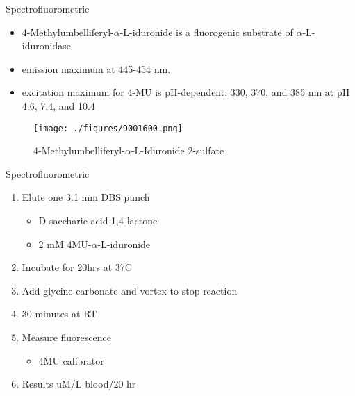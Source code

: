 \documentclass[presentation, smaller]{beamer}
\begin{document}
\begin{frame}[label={sec:orgheadline10}]{Spectrofluorometric}
\begin{itemize}
\item 4-Methylumbelliferyl-\(\alpha\)-L-iduronide is a fluorogenic substrate of \(\alpha\)-L-iduronidase
\item emission maximum at 445-454 nm.
\item excitation maximum for 4-MU is pH-dependent: 330, 370, and 385 nm at pH 4.6, 7.4, and 10.4
\end{itemize}

\begin{figure}[htb]
\centering
\texttt{[image: ./figures/9001600.png]}
\caption[4MUI]{\label{fig:4mui}
4-Methylumbelliferyl-\(\alpha\)-L-Iduronide 2-sulfate}
\end{figure}
\end{frame}


\begin{frame}[label={sec:orgheadline11}]{Spectrofluorometric}
\begin{enumerate}
\item Elute one 3.1 mm DBS punch
\begin{itemize}
\item D-saccharic acid-1,4-lactone
\item 2 mM 4MU-\(\alpha\)-L-iduronide
\end{itemize}
\item Incubate for 20hrs at 37\degree C
\item Add glycine-carbonate and vortex to stop reaction
\item 30 minutes at RT
\item Measure fluorescence
\begin{itemize}
\item 4MU calibrator
\end{itemize}
\item Results uM/L blood/20 hr
\end{enumerate}
\end{frame}
\end{document}
